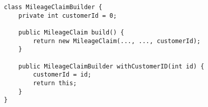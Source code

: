 \begin{verbatim}
    class MileageClaimBuilder {
        private int customerId = 0;
    
        public MileageClaim build() {
            return new MileageClaim(..., ..., customerId);
        }
    
        public MileageClaimBuilder withCustomerID(int id) {
            customerId = id;
            return this;
        }
    }
\end{verbatim}
